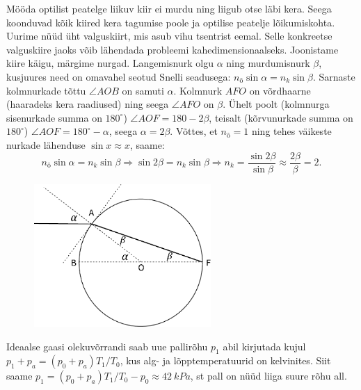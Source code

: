 \documentclass[10pt]{article}
\begin{document}
\solu
Mööda optilist peatelge liikuv kiir ei murdu ning liigub otse läbi kera. Seega koonduvad kõik kiired kera tagumise poole ja optilise peatelje lõikumiskohta. Uurime nüüd üht valguskiirt, mis asub vihu tsentrist eemal. Selle konkreetse valguskiire jaoks võib lähendada probleemi kahedimensionaalseks. Joonistame kiire käigu, märgime nurgad. Langemisnurk olgu $\alpha$ ning murdumisnurk $\beta$, kusjuures need on omavahel seotud Snelli seadusega: $n_{õ}\sin\alpha=n_{k}\sin\beta$. Sarnaste kolmnurkade tõttu $\angle AOB$ on samuti $\alpha$. Kolmnurk $AFO$ on võrdhaarne (haaradeks kera raadiused) ning seega $\angle AFO$ on $\beta$. Ühelt poolt (kolmnurga sisenurkade summa on $180^\circ$) $\angle AOF=180-2\beta$, teisalt (kõrvunurkade summa on $180^\circ$) $\angle AOF=180^\circ-\alpha$, seega $\alpha=2\beta$. Võttes, et $n_{õ}=1$ ning tehes väikeste nurkade lähenduse $\sin x \approx x$, saame:
$$n_{õ}\sin\alpha=n_{k}\sin\beta \Rightarrow \sin2\beta=n_{k}\sin\beta \Rightarrow n_k = \frac{\sin2\beta}{\sin\beta}\approx\frac{2\beta}{\beta}=2.$$
\begin{figure}[htbp!]
\centering
\includegraphics[width=0.6\textwidth]{2020-v3g-01-yl.pdf}
\end{figure}
\probend
\bigskip


\solu
Ideaalse gaasi olekuvõrrandi saab uue pallirõhu $p_1$ abil kirjutada kujul $p_1+p_a=(p_0+p_a)T_1/T_0$, kus alg- ja lõpptemperatuurid on kelvinites. Siit saame $p_1=(p_0+p_a)T_1/T_0-p_0\approx \SI{42}{kPa}$, st pall on nüüd liiga suure rõhu all.
\probend
\bigskip

\end{document}
